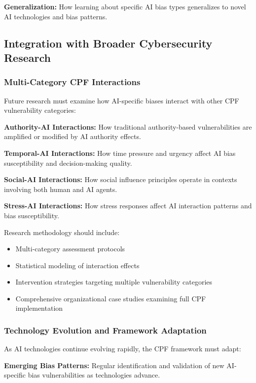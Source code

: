 \documentclass[11pt,a4paper]{article}
\begin{document}
\textbf{Generalization:} How learning about specific AI bias types generalizes to novel AI technologies and bias patterns.

\subsection{Integration with Broader Cybersecurity Research}

\subsubsection{Multi-Category CPF Interactions}

Future research must examine how AI-specific biases interact with other CPF vulnerability categories:

\textbf{Authority-AI Interactions:} How traditional authority-based vulnerabilities are amplified or modified by AI authority effects.

\textbf{Temporal-AI Interactions:} How time pressure and urgency affect AI bias susceptibility and decision-making quality.

\textbf{Social-AI Interactions:} How social influence principles operate in contexts involving both human and AI agents.

\textbf{Stress-AI Interactions:} How stress responses affect AI interaction patterns and bias susceptibility.

Research methodology should include:
\begin{itemize}
\item Multi-category assessment protocols
\item Statistical modeling of interaction effects
\item Intervention strategies targeting multiple vulnerability categories
\item Comprehensive organizational case studies examining full CPF implementation
\end{itemize}

\subsubsection{Technology Evolution and Framework Adaptation}

As AI technologies continue evolving rapidly, the CPF framework must adapt:

\textbf{Emerging Bias Patterns:} Regular identification and validation of new AI-specific bias vulnerabilities as technologies advance.
\end{document}
